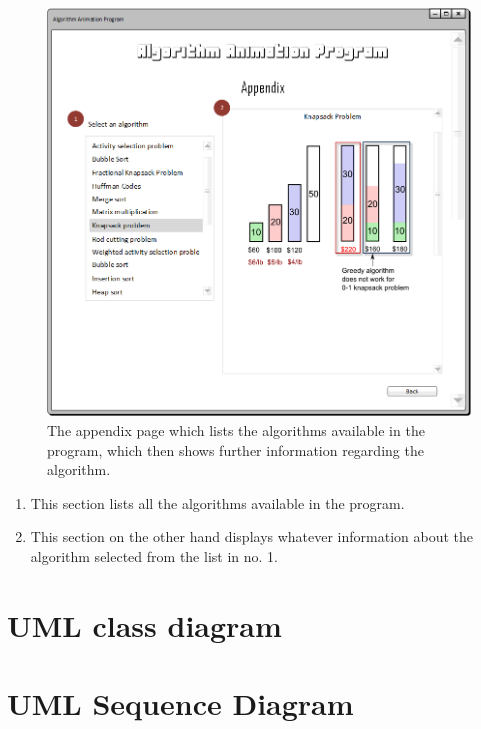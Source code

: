 \begin{figure}[H]
\centering
\hspace*{-0.5cm}
\includegraphics[scale=0.8]{images/report_images/uiAppendix.png}
\caption{The appendix page which lists the algorithms available in the program, which then shows further information regarding the algorithm.}
\label{uiAppendix}
\end{figure}

\begin{enumerate}
\item This section lists all the algorithms available in the program.
\item This section on the other hand displays whatever information about the algorithm selected from the list in no. 1.
\end{enumerate}

\newpage

\section{UML class diagram}

\newpage

\section{UML Sequence Diagram}

